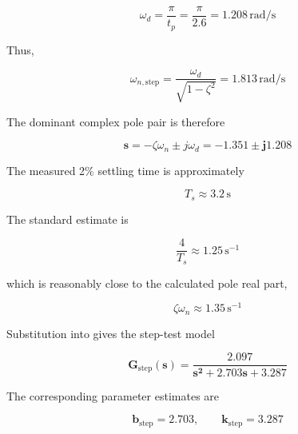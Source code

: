 \documentclass[12pt,a4paper]{article}
\begin{document}
\begin{equation}
    \omega_d
    = \frac{\pi}{t_p}
    = \frac{\pi}{2.6}
    = \mathbf{1.208}\,\mathrm{rad/s}
    \tag{13}
\end{equation}

Thus,

\begin{equation}
    \omega_{n,\mathrm{step}}
    = \frac{\omega_d}{\sqrt{1-\zeta^2}}
    = \mathbf{1.813}\,\mathrm{rad/s}
    \tag{14}
\end{equation}

The dominant complex pole pair is therefore

\begin{equation}
    \boldsymbol{s}
    = -\zeta\omega_n \pm j\omega_d
    = \mathbf{-1.351 \pm j1.208}
    \tag{15}
    \label{eq:step_poles}
\end{equation}

The measured 2\% settling time is approximately

\begin{equation}
    T_s
    \approx \mathbf{3.2}\,\mathrm{s}
    \tag{16}
\end{equation}

The standard estimate is

\begin{equation}
    \frac{4}{T_s}
    \approx \mathbf{1.25}\,\mathrm{s^{-1}}
    \tag{17}
\end{equation}

which is reasonably close to the calculated pole real part,

\begin{equation}
    \zeta\omega_n
    \approx \mathbf{1.35}\,\mathrm{s^{-1}}
    \tag{18}
\end{equation}

Substitution into  gives the step-test model

\begin{equation}
    \boxed{
        \boldsymbol{
        G_{\mathrm{step}}(s)
        = \frac{2.097}
        {s^2 + 2.703s + 3.287}
        }
    }
    \tag{19}
    \label{eq:gstep}
\end{equation}

The corresponding parameter estimates are

\begin{equation}
    \boldsymbol{b_{\mathrm{step}} = 2.703},
    \qquad
    \boldsymbol{k_{\mathrm{step}} = 3.287}
    \tag{20}
\end{equation}
\end{document}
